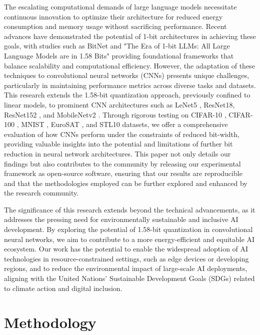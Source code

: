 \documentclass{article}
\begin{document}
The escalating computational demands of large language models necessitate continuous innovation to optimize their architecture for reduced energy consumption and memory usage without sacrificing performance. Recent advances have demonstrated the potential of 1-bit architectures in achieving these goals, with studies such as BitNet \cite{wang2023bitnet} and "The Era of 1-bit LLMs: All Large Language Models are in 1.58 Bits" \cite{ma2024era} providing foundational frameworks that balance scalability and computational efficiency. However, the adaptation of these techniques to convolutional neural networks (CNNs) presents unique challenges, particularly in maintaining performance metrics across diverse tasks and datasets. This research extends the 1.58-bit quantization approach, previously confined to linear models, to prominent CNN architectures such as LeNet5 \cite{lecun-gradientbased-learning-applied-1998}, ResNet18, ResNet152 \cite{he2015deep}, and MobileNetv2 \cite{sandler2019mobilenetv2}. Through rigorous testing on CIFAR-10 \cite{cifar10}, CIFAR-100 \cite{cifar100}, MNIST \cite{deng2012mnist}, EuroSAT \cite{helber2019eurosat}, and STL10 \cite{stl10} datasets, we offer a comprehensive evaluation of how CNNs perform under the constraints of reduced bit-width, providing valuable insights into the potential and limitations of further bit reduction in neural network architectures. This paper not only details our findings but also contributes to the community by releasing our experimental framework as open-source software, ensuring that our results are reproducible and that the methodologies employed can be further explored and enhanced by the research community.

The significance of this research extends beyond the technical advancements, as it addresses the pressing need for environmentally sustainable and inclusive AI development. By exploring the potential of 1.58-bit quantization in convolutional neural networks, we aim to contribute to a more energy-efficient and equitable AI ecosystem. Our work has the potential to enable the widespread adoption of AI technologies in resource-constrained settings, such as edge devices or developing regions, and to reduce the environmental impact of large-scale AI deployments, aligning with the United Nations' Sustainable Development Goals (SDGs) \cite{Agenda2023} related to climate action and digital inclusion.


\section{Methodology}
\end{document}
